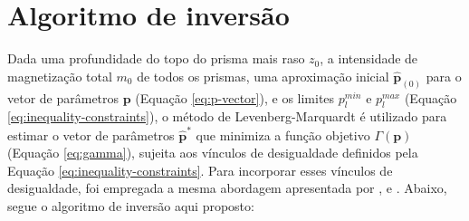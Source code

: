 \section{Algoritmo de inversão}

Dada uma profundidade do topo do prisma mais raso $z_{0}$, a intensidade de magnetização total $m_{0}$ de todos os prismas, uma aproximação inicial $\hat{\mathbf{p}}_{(0)}$ para o vetor de parâmetros $\mathbf{p}$ (Equação \ref{eq:p-vector}), e os limites 
$p_{l}^{min}$ e $p_{l}^{max}$ (Equação \ref{eq:inequality-constraints}), o método de Levenberg-Marquardt \cite[por exemplo, ][ p. 624]{seber_wild2003} é utilizado para estimar o vetor de parâmetros $\hat{\mathbf{p}}^{\ast}$ que minimiza a função objetivo $\Gamma (\mathbf{p})$ (Equação \ref{eq:gamma}), sujeita aos vínculos de desigualdade definidos pela Equação \ref{eq:inequality-constraints}.
Para incorporar esses vínculos de desigualdade, foi empregada a mesma abordagem apresentada por \cite{barbosa_etal1999}, \cite{oliveirajr_etal2011} e \cite{oliveirajr_barbosa2013}.
Abaixo, segue o algoritmo de inversão aqui proposto:

